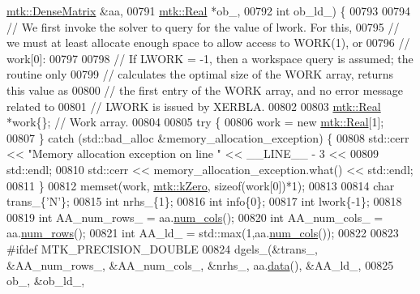 \begin{DoxyCode}
      \hyperlink{classmtk_1_1DenseMatrix}{mtk::DenseMatrix} &aa,
00791                                                    \hyperlink{group__c01-roots_gac080bbbf5cbb5502c9f00405f894857d}{mtk::Real} *ob\_,
00792                                                    \textcolor{keywordtype}{int} ob\_ld\_) \{
00793 
00794   \textcolor{comment}{// We first invoke the solver to query for the value of lwork. For this,}
00795   \textcolor{comment}{// we must at least allocate enough space to allow access to WORK(1), or}
00796   \textcolor{comment}{// work[0]:}
00797 
00798   \textcolor{comment}{// If LWORK = -1, then a workspace query is assumed; the routine only}
00799   \textcolor{comment}{// calculates the optimal size of the WORK array, returns this value as}
00800   \textcolor{comment}{// the first entry of the WORK array, and no error message related to}
00801   \textcolor{comment}{// LWORK is issued by XERBLA.}
00802 
00803   \hyperlink{group__c01-roots_gac080bbbf5cbb5502c9f00405f894857d}{mtk::Real} *work\{\}; \textcolor{comment}{// Work array.}
00804 
00805   \textcolor{keywordflow}{try} \{
00806     work = \textcolor{keyword}{new} \hyperlink{group__c01-roots_gac080bbbf5cbb5502c9f00405f894857d}{mtk::Real}[1];
00807   \} \textcolor{keywordflow}{catch} (std::bad\_alloc &memory\_allocation\_exception) \{
00808     std::cerr << \textcolor{stringliteral}{"Memory allocation exception on line "} << \_\_LINE\_\_ - 3 <<
00809       std::endl;
00810     std::cerr << memory\_allocation\_exception.what() << std::endl;
00811   \}
00812   memset(work, \hyperlink{group__c01-roots_ga59a451a5fae30d59649bcda274fea271}{mtk::kZero}, \textcolor{keyword}{sizeof}(work[0])*1);
00813 
00814   \textcolor{keywordtype}{char} trans\_\{\textcolor{charliteral}{'N'}\};
00815   \textcolor{keywordtype}{int} nrhs\_\{1\};
00816   \textcolor{keywordtype}{int} info\{0\};
00817   \textcolor{keywordtype}{int} lwork\{-1\};
00818 
00819   \textcolor{keywordtype}{int} AA\_num\_rows\_  = aa.\hyperlink{classmtk_1_1DenseMatrix_a41747502d468c6728a4be31501b16e0e}{num\_cols}();
00820   \textcolor{keywordtype}{int} AA\_num\_cols\_  = aa.\hyperlink{classmtk_1_1DenseMatrix_a53f3afb3b6a8d21854458aaa9663cc74}{num\_rows}();
00821   \textcolor{keywordtype}{int} AA\_ld\_ = std::max(1,aa.\hyperlink{classmtk_1_1DenseMatrix_a41747502d468c6728a4be31501b16e0e}{num\_cols}());
00822 
00823 \textcolor{preprocessor}{  #ifdef MTK\_PRECISION\_DOUBLE}
00824   dgels\_(&trans\_, &AA\_num\_rows\_, &AA\_num\_cols\_, &nrhs\_, aa.\hyperlink{classmtk_1_1DenseMatrix_a0c33b8a9e01d157c61ddbdf807c25d84}{data}(), &AA\_ld\_,
00825          ob\_, &ob\_ld\_,

\end{DoxyCode}
